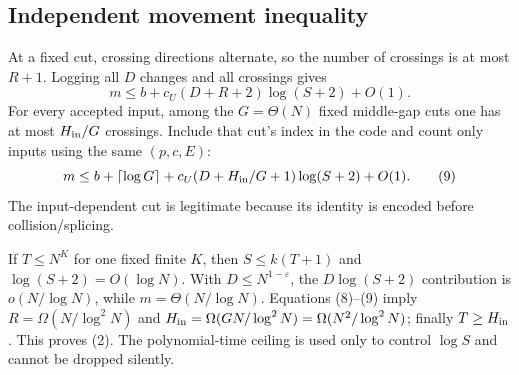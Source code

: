 \documentclass[11pt]{article}
\begin{document}
\subsection{Independent movement inequality}
At a fixed cut, crossing directions alternate, so the number of crossings is
at most $R+1$.  Logging all $D$ changes and all crossings gives
\[
 m\le b+c_U(D+R+2)\log(S+2)+O(1).
 \tag{8}
\]
For every accepted input, among the $G=\Theta(N)$ fixed middle-gap cuts one has
at most $H_{\rm in}/G$ crossings.  Include that cut's index in the code and
count only inputs using the same $(p,c,E)$:
\[
 m\le b+\lceil\log G\rceil
      +c_U(D+H_{\rm in}/G+1)\log(S+2)+O(1).
 \tag{9}
\]
The input-dependent cut is legitimate because its identity is encoded before
collision/splicing.

If $T\le N^K$ for one fixed finite $K$, then
$S\le k(T+1)$ and $\log(S+2)=O(\log N)$.  With
$D\le N^{1-\varepsilon}$, the $D\log(S+2)$ contribution is
$o(N/\log N)$, while $m=\Theta(N/\log N)$.  Equations (8)--(9) imply
$R=\Omega(N/\log^2N)$ and
$H_{\rm in}=\Omega(GN/\log^2N)=\Omega(N^2/\log^2N)$; finally
$T\ge H_{\rm in}$.  This proves (2).  The polynomial-time ceiling is used only
to control $\log S$ and cannot be dropped silently.
\end{document}

